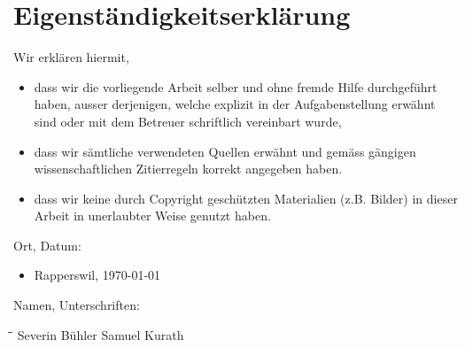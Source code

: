 \chapter{Eigenständigkeitserklärung}

Wir erklären hiermit,
\begin{itemize}
	\item dass wir die vorliegende Arbeit selber und ohne fremde Hilfe durchgeführt haben, ausser derjenigen, welche explizit in der Aufgabenstellung erwähnt sind oder mit dem Betreuer schriftlich vereinbart wurde,
	\item dass wir sämtliche verwendeten Quellen erwähnt und gemäss gängigen wissenschaftlichen Zitierregeln korrekt angegeben haben.
	\item dass wir keine durch Copyright geschützten Materialien (z.B. Bilder) in dieser Arbeit in unerlaubter Weise genutzt haben.
\end{itemize}

\vspace{2cm}

Ort, Datum:

\begin{itemize}
	\item[] Rapperswil, \today
\end{itemize}


\vspace{1cm}
Namen, Unterschriften:
\vspace{2cm}
\begin{tabbing}[H]
    \hspace*{1cm}\=\hspace*{8cm}\=\hspace*{6cm}\= \kill
     \> Severin Bühler \> Samuel Kurath \\
\end{tabbing}

